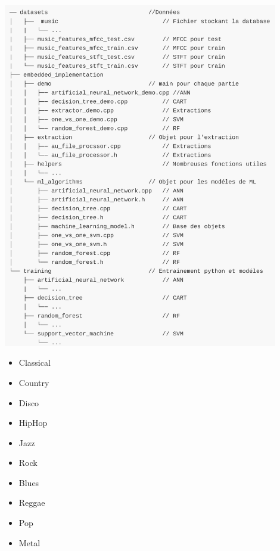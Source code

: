 \documentclass[10pt]{article}
\begin{document}
\begin{minipage}[ht]{0.6\linewidth}
\centering
\includegraphics[width=0.9\textwidth]{DirectoryOrganisation.png}
\end{minipage}
\begin{minipage}[h]{0.3\linewidth}
\begin{itemize}
  \item Classical
  \item Country
  \item Disco
  \item HipHop
  \item Jazz
  \item Rock
  \item Blues
  \item Reggae
  \item Pop
  \item Metal
\end{itemize}
\end{minipage}


\end{document}
